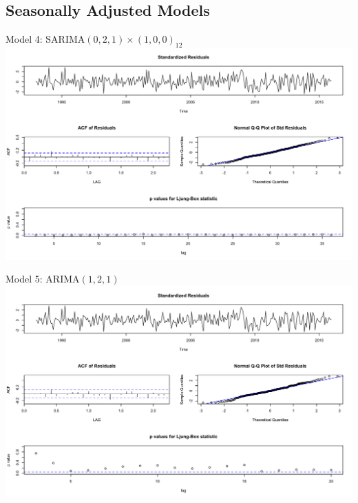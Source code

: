 {     \subsection{Seasonally Adjusted Models}
     \begin{frame}{Model 4: SARIMA\((0,2,1) \times (1,0,0)_{12}\)}
     	\includegraphics[width=\linewidth]{images/seasonallyadjustedmodel4}
     \end{frame}
     
     
     \begin{frame}{Model 5: ARIMA\((1,2,1)\)}
     	\includegraphics[width=\linewidth]{images/seasonallyadjustedmodel5}
     \end{frame}
     
     
}
